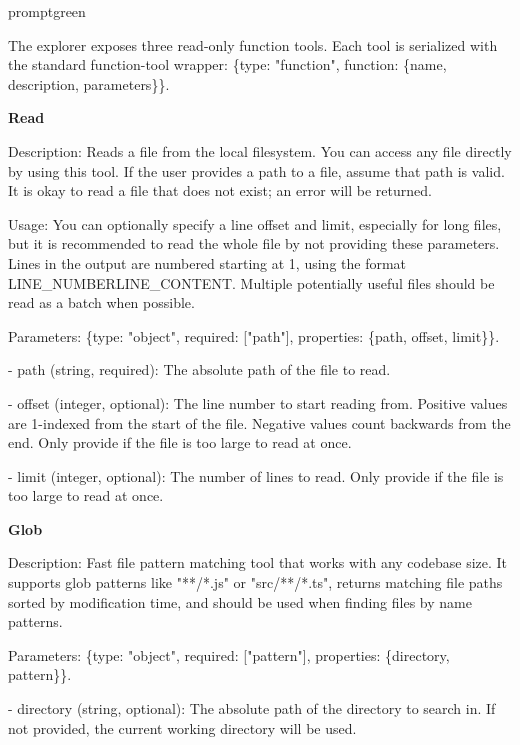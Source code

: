 \begin{promptbox}{promptgreen}
{\ttfamily\tiny\raggedright\sloppy
The explorer exposes three read-only function tools. Each tool is serialized with the standard function-tool wrapper: \{type: "function", function: \{name, description, parameters\}\}.\par
\vspace{0.35em}\par
\textbf{Read}\par
Description: Reads a file from the local filesystem. You can access any file directly by using this tool. If the user provides a path to a file, assume that path is valid. It is okay to read a file that does not exist; an error will be returned.\par
Usage: You can optionally specify a line offset and limit, especially for long files, but it is recommended to read the whole file by not providing these parameters. Lines in the output are numbered starting at 1, using the format LINE\_NUMBER\textbar{}LINE\_CONTENT. Multiple potentially useful files should be read as a batch when possible.\par
Parameters: \{type: "object", required: ["path"], properties: \{path, offset, limit\}\}.\par
- path (string, required): The absolute path of the file to read.\par
- offset (integer, optional): The line number to start reading from. Positive values are 1-indexed from the start of the file. Negative values count backwards from the end. Only provide if the file is too large to read at once.\par
- limit (integer, optional): The number of lines to read. Only provide if the file is too large to read at once.\par
\vspace{0.35em}\par
\textbf{Glob}\par
Description: Fast file pattern matching tool that works with any codebase size. It supports glob patterns like "**/*.js" or "src/**/*.ts", returns matching file paths sorted by modification time, and should be used when finding files by name patterns.\par
Parameters: \{type: "object", required: ["pattern"], properties: \{directory, pattern\}\}.\par
- directory (string, optional): The absolute path of the directory to search in. If not provided, the current working directory will be used.\par
}
\end{promptbox}
